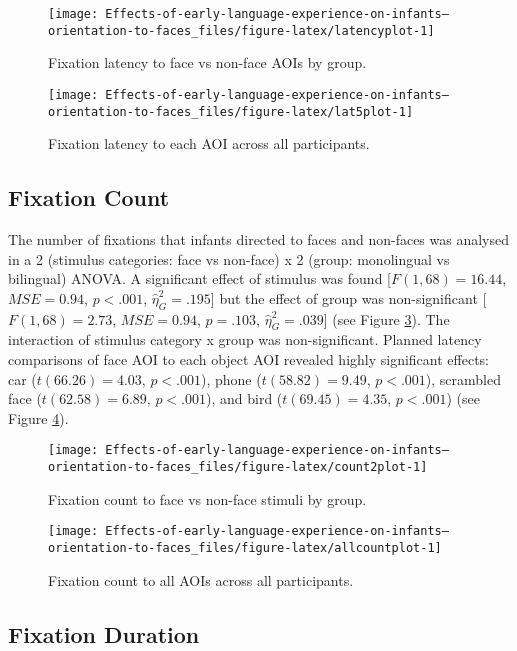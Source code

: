 \documentclass[english,man,floatsintext]{apa6}
\begin{document}
\begin{figure}
\texttt{[image: Effects-of-early-language-experience-on-infants--orientation-to-faces\_files/figure-latex/latencyplot-1]} \caption{Fixation latency to face vs non-face AOIs by group.}\label{fig:latencyplot}
\end{figure}
\begin{figure}
\texttt{[image: Effects-of-early-language-experience-on-infants--orientation-to-faces\_files/figure-latex/lat5plot-1]} \caption{Fixation latency to each AOI across all participants.}\label{fig:lat5plot}
\end{figure}

\hypertarget{fixation-count}{%
\subsection{Fixation Count}\label{fixation-count}}

The number of fixations that infants directed to faces and non-faces was analysed in a 2 (stimulus categories: face vs non-face) x 2 (group: monolingual vs bilingual) ANOVA. A significant effect of stimulus was found {[}\(F(1, 68) = 16.44\), \(\mathit{MSE} = 0.94\), \(p < .001\), \(\hat{\eta}^2_G = .195\){]} but the effect of group was non-significant {[}\(F(1, 68) = 2.73\), \(\mathit{MSE} = 0.94\), \(p = .103\), \(\hat{\eta}^2_G = .039\){]} (see Figure \ref{fig:count2plot}). The interaction of stimulus category x group was non-significant. Planned latency comparisons of face AOI to each object AOI revealed highly significant effects: car (\(t(66.26) = 4.03\), \(p < .001\)), phone (\(t(58.82) = 9.49\), \(p < .001\)), scrambled face (\(t(62.58) = 6.89\), \(p < .001\)), and bird (\(t(69.45) = 4.35\), \(p < .001\)) (see Figure \ref{fig:allcountplot}).

\begin{figure}
\texttt{[image: Effects-of-early-language-experience-on-infants--orientation-to-faces\_files/figure-latex/count2plot-1]} \caption{Fixation count to face vs non-face stimuli by group.}\label{fig:count2plot}
\end{figure}
\begin{figure}
\texttt{[image: Effects-of-early-language-experience-on-infants--orientation-to-faces\_files/figure-latex/allcountplot-1]} \caption{Fixation count to all AOIs across all participants.}\label{fig:allcountplot}
\end{figure}

\hypertarget{fixation-duration}{%
\subsection{Fixation Duration}\label{fixation-duration}}
\end{document}
